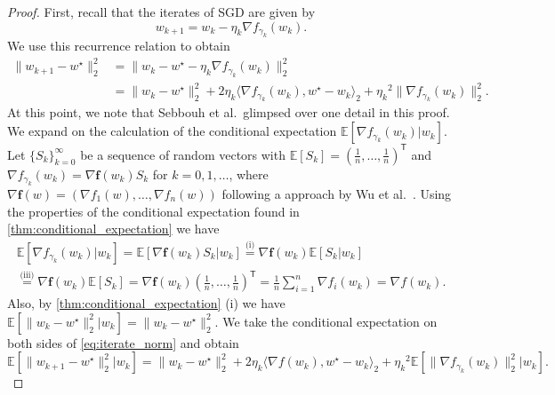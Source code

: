 \documentclass[12pt]{article}
\theoremstyle{definition}
\numberwithin{equation}{section}
\newcommand{\E}{\mathbb{E}}
\newcommand{\T}{\mathsf{T}}
\newcommand{\ev}[1]{\mathbb{E}\left[{#1}\right]}
\newcommand{\norm}[1]{\lVert{#1}\rVert_2}
\newcommand{\scp}[2]{\langle{#1}, {#2}\rangle_2}
\begin{document}
\begin{proof}
  First, recall that the iterates of SGD are given by
  \begin{equation*}
    w_{k+1} = w_{k} - \eta_k \nabla f_{\gamma_k}(w_{k}).
  \end{equation*}
  We use this recurrence relation to obtain
  \begin{equation}
    \label{eq:iterate_norm}
    \begin{split}
      \norm{w_{k+1} - w^\star}^2 &= \norm{w_{k} - w^\star - \eta_k \nabla f_{\gamma_k}(w_{k})}^2 \\
    &= \norm{w_{k} - w^\star}^2 + 2 \eta_k \scp{\nabla f_{\gamma_k}(w_{k})}{ w^\star - w_{k}} + {\eta_k}^2\norm{\nabla f_{\gamma_k}(w_{k})}^2.
    \end{split}
  \end{equation}
  At this point, we note that Sebbouh et al.\ glimpsed over one detail in this proof. We expand on the calculation of the conditional expectation $\ev{\nabla f_{\gamma_k}(w_k)| w_k}$.
  Let $\{S_k\}_{k=0}^\infty$ be a sequence of random vectors with $\ev{S_k} = \left(\frac{1}{n}, \dots, \frac{1}{n}\right)^\T$ and $\nabla f_{\gamma_k}(w_k) = \nabla \mathbf{f}(w_k)S_k$ for $k=0,1,\dots$,
  where $\nabla \mathbf{f}(w) = \left(\nabla f_1(w), \dots, \nabla f_n(w)\right)$ following a approach by Wu et al.\ \cite{wuNoisyGradientDescent2020a}. Using the properties of the conditional expectation found in \autoref{thm:conditional_expectation} we have
  \begin{multline*}
    \ev{\nabla f_{\gamma_k}(w_k)|w_k} = \ev{\nabla \mathbf{f}(w_k)S_k|w_k} \stackrel{\text{(i)}}{=} \nabla \mathbf{f}(w_k) \ev{S_k|w_k} \\
    \stackrel{\text{(iii)}}{=} \nabla \mathbf{f}(w_k) \ev{S_k} = \nabla \mathbf{f}(w_k) \left(\frac{1}{n}, \dots, \frac{1}{n}\right)^\T = \frac{1}{n}\sum_{i=1}^n \nabla f_i(w_k) = \nabla f(w_k).
  \end{multline*}
  Also, by \autoref{thm:conditional_expectation} (i) we have $\ev{\norm{w_{k} - w^\star}^2|w_k} = \norm{w_{k} - w^\star}^2$.
  We take the conditional expectation on both sides of \eqref{eq:iterate_norm} and obtain
  \begin{equation*}
    \E[\norm{w_{k+1} - w^\star}^2|w_k] = \norm{w_{k} - w^\star}^2 + 2 \eta_k \scp{\nabla f(w_{k})}{w^\star - w_{k}}+ {\eta_k}^2\E[\norm{\nabla f_{\gamma_k}(w_{k})}^2|w_k].

\end{equation*}
\end{proof}
\end{document}
